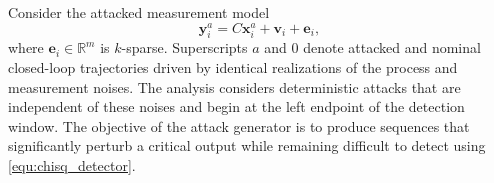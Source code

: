 Consider the attacked measurement model
\begin{equation}\label{equ:adversarial_measurement_model}
\mathbf{y}_i^a=C\mathbf{x}_i^a+\mathbf{v}_i+\mathbf{e}_i,
\end{equation}
where $\mathbf{e}_i\in\mathbb{R}^m$ is $k$-sparse. Superscripts $a$ and $0$ denote attacked and nominal closed-loop trajectories driven by identical realizations of the process and measurement noises. The analysis considers deterministic attacks that are independent of these noises and begin at the left endpoint of the detection window. The objective of the attack generator is to produce sequences that significantly perturb a critical output while remaining difficult to detect using \eqref{equ:chisq_detector}.

